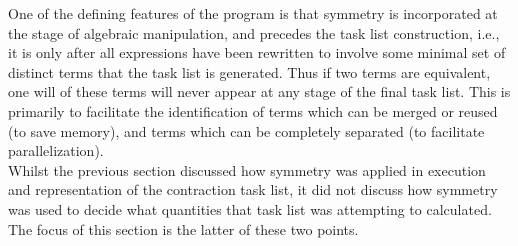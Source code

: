 \documentclass[12pt]{article}
\begin{document}
\noindent One of the defining features of the program is that symmetry is
incorporated at the stage of algebraic manipulation, and precedes the task list
construction, i.e., it is only after all expressions have been rewritten to
involve some minimal set of distinct terms that the task list is generated.
Thus if two terms are equivalent, one will of these terms will never appear at
any stage of the final task list.  This is primarily to facilitate the
identification of terms which can be merged or reused (to save memory), and
terms which can be completely separated (to facilitate parallelization).\\

\noindent Whilst the previous section discussed how symmetry was applied in 
execution and representation of the contraction task list, it did not
discuss how symmetry was used to decide what quantities that task list was
attempting to calculated. The focus of this section is the latter of these 
two points.\\
\end{document}
